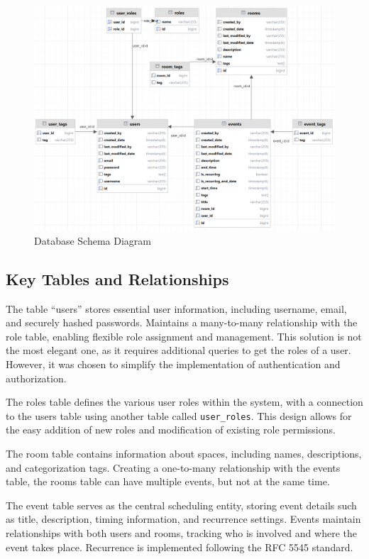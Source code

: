 \begin{figure}[h]
    \centering
    \includegraphics[width=1\textwidth]{schemaDB}
    \caption{Database Schema Diagram}
    \label{fig:schemaDB}
\end{figure}

\subsection{Key Tables and Relationships}\label{subsec:key-tables}

The table ``users'' stores essential user information, including username, email, and securely hashed passwords.
Maintains a many-to-many relationship with the role table, enabling flexible role assignment and management.
This solution is not the most elegant one, as it requires additional queries to get the roles of a user.
However, it was chosen to simplify the implementation of authentication and authorization.

The roles table defines the various user roles within the system, with a connection to the users table using another table called \texttt{user\_roles}.
This design allows for the easy addition of new roles and modification of existing role permissions.

The room table contains information about spaces, including names, descriptions, and categorization tags.
Creating a one-to-many relationship with the events table, the rooms table can have multiple events, but not at the same time.

The event table serves as the central scheduling entity, storing event details such as title, description, timing information, and recurrence settings.
Events maintain relationships with both users and rooms, tracking who is involved and where the event takes place.
Recurrence is implemented following the RFC 5545 standard.

